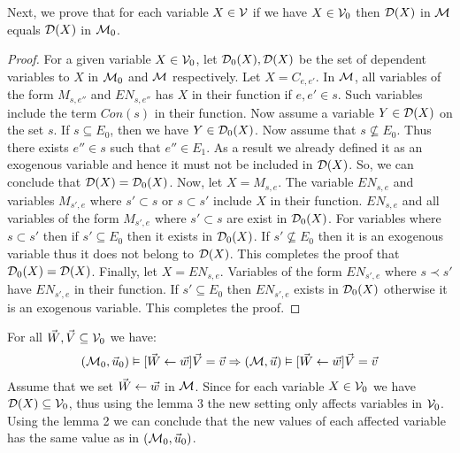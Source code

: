 \begin{lemma}
    Next, we prove that for each variable $X \in \mathcal{V}$ if we have
    $X \in \mathcal{V}_0$ then $\mathcal{D}(X)$ in $\mathcal{M}$ equals $\mathcal{D}(X)$ in $\mathcal{M}_0$.
\end{lemma}
\begin{proof}
    For a given variable $X \in \mathcal{V}_0$, let $\mathcal{D}_0(X),\mathcal{D}(X)$
    be the set of dependent variables to $X$ in $\mathcal{M}_0$ and $\mathcal{M}$ respectively.
    Let $X = C_{e,e'}$.
    In $\mathcal{M}$, all variables of the form $M_{s,e''}$ and $EN_{s,e''}$ has
    $X$ in their function if $e,e' \in s$.
    Such variables include the term $Con(s)$ in their function.
    Now assume a variable $Y \in \mathcal{D}(X)$ on the set $s$.
    If $s \subseteq E_0$, then we have $Y \in \mathcal{D}_0(X)$.
    Now assume that $s \not \subseteq E_0$.
    Thus there exists $e'' \in s$ such that $e'' \in E_1$.
    As a result we already defined it as an exogenous variable and hence
    it must not be included in $\mathcal{D}(X)$.
    So, we can conclude that $\mathcal{D}(X) = \mathcal{D}_0(X)$.
    Now, let $X = M_{s,e}$.
    The variable $EN_{s,e}$ and variables $M_{s',e}$ where
    $s' \subset s$ or $s \subset s'$ include $X$ in their function.
    $EN_{s,e}$ and all variables of the form $M_{s',e}$ where
    $s' \subset s$ are exist in $\mathcal{D}_0(X)$.
    For variables where $s \subset s'$ then if $s' \subseteq E_0$ then
    it exists in $\mathcal{D}_0(X)$.
    If $s' \not \subseteq E_0$ then it is an exogenous variable thus it does
    not belong to $\mathcal{D}(X)$.
    This completes the proof that $\mathcal{D}_0(X) = \mathcal{D}(X)$.
    Finally, let $X = EN_{s,e}$.
    Variables of the form $EN_{s',e}$ where $s \prec s'$ have $EN_{s',e}$
    in their function.
    If $s' \subseteq E_0$ then $EN_{s',e}$ exists in $\mathcal{D}_0(X)$
    otherwise it is an exogenous variable.
    This completes the proof.


\end{proof}

\begin{lemma}
    For all $\vec W, \vec V \subseteq \mathcal{V}_0$ we have:
    \begin{align*}
        (\mathcal{M}_0,\vec u_0) \vDash [\vec W \leftarrow \vec w]\vec V = \vec v
        \Rightarrow (\mathcal{M},\vec u) \vDash [\vec W \leftarrow \vec w] \vec V = \vec v
    \end{align*}
    Assume that we set $\vec W \leftarrow \vec w$ in $\mathcal{M}$.
    Since for each variable $X \in \mathcal{V}_0$ we have 
    $\mathcal{D}(X) \subseteq \mathcal{V}_0$, thus using the lemma 3 the new setting 
    only affects variables in $\mathcal{V}_0$.
    Using the lemma 2 we can conclude that the new values of each affected 
    variable has the same value as in $(\mathcal{M}_0,\vec u_0)$.
\end{lemma}

